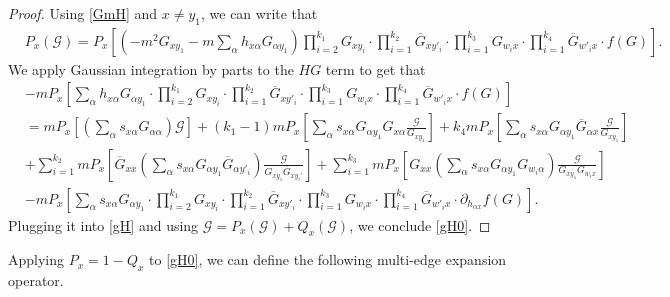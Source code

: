 \documentclass{article}
\newcommand{\1}{\mathds{1}}
\numberwithin{equation}{section}
\newcommand{\al}{\alpha}
\newcommand{\be}{\begin{equation}}
\newcommand{\ee}{\end{equation}}
\renewcommand{\cal}{\mathcal}
\theoremstyle{plain} %
\theoremstyle{remark}
\begin{document}
 \begin{proof}
Using \eqref{GmH} and $x\ne y_1$, we can write that
 \be
  \begin{split}\label{gH}
 & P_x \left(  \cal G \right) =P_x \left[ \left( - m^2 G_{xy_1} - m \sum_\al h_{x\al }G_{\al y_1}\right) \prod_{i=2}^{k_1}G_{x y_i}  \cdot  \prod_{i=1}^{k_2}\overline G_{x y'_i} \cdot \prod_{i=1}^{k_3} G_{ w_i x} \cdot \prod_{i=1}^{k_4}\overline G_{ w'_i x}\cdot f(G)\right] .
 \end{split} 
 \ee
We apply Gaussian integration by parts to the $HG$ term to get that
  \begin{align*}
 & - m P_x \left[  \sum_\al h_{x\al }G_{\al y_1}\cdot \prod_{i=2}^{k_1}G_{x y_i}  \cdot  \prod_{i=1}^{k_2}\overline G_{x y'_i} \cdot \prod_{i=1}^{k_3} G_{ w_i x} \cdot \prod_{i=1}^{k_4}\overline G_{ w'_i x}\cdot f(G)\right] \\
 &=  m P_x \left[  \left(\sum_\al s_{x\al }G_{\al \al}\right) \cal G\right] +(k_1-1) m P_x \left[  \sum_\al s_{x\al }G_{\al y_1} G_{x \al} \frac{\cal G}{G_{xy_1}}\right] + k_4 m P_x \left[  \sum_\al s_{x\al }G_{\al y_1} \overline G_{\al x} \frac{\cal G}{G_{xy_1}}\right] \\
 &+  \sum_{i=1}^{k_2}m P_x \left[ \overline G_{xx}  \left( \sum_\al s_{x\al }G_{\al y_1} \overline G_{\al y'_i}\right)\frac{\cal G}{G_{x y_1} \overline G_{xy_i'}} \right] + \sum_{i=1}^{k_3} m P_x \left[ G_{xx} \left(\sum_\al s_{x\al }G_{\al y_1} G_{w_i \al} \right)\frac{\cal G}{G_{xy_1}G_{w_i x}}\right] \\
 & - m P_x \left[  \sum_\al s_{x\al }G_{\al y_1}\cdot \prod_{i=2}^{k_1}G_{x y_i}  \cdot  \prod_{i=1}^{k_2}\overline G_{x y'_i} \cdot \prod_{i=1}^{k_3} G_{ w_i x} \cdot \prod_{i=1}^{k_4}\overline G_{ w'_i x} \cdot\partial_{  h_{\al x}}f(G)\right].
 \end{align*}
Plugging it into \eqref{gH} and using $\cal G=P_x(\cal G)+Q_x(\cal G)$, we conclude \eqref{gH0}.
\end{proof}


Applying $P_x=1-Q_x$ to \eqref{gH0}, we can define the following multi-edge expansion operator.
\end{document}
